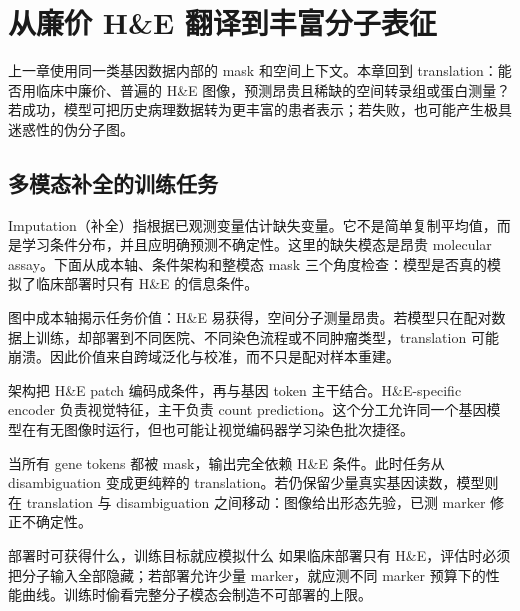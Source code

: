 \section{从廉价 H\&E 翻译到丰富分子表征}

上一章使用同一类基因数据内部的 mask 和空间上下文。本章回到 translation：能否用临床中廉价、普遍的 H\&E 图像，预测昂贵且稀缺的空间转录组或蛋白测量？若成功，模型可把历史病理数据转为更丰富的患者表示；若失败，也可能产生极具迷惑性的伪分子图。

\subsection{多模态补全的训练任务}

Imputation（补全）指根据已观测变量估计缺失变量。它不是简单复制平均值，而是学习条件分布，并且应明确预测不确定性。这里的缺失模态是昂贵 molecular assay。下面从成本轴、条件架构和整模态 mask 三个角度检查：模型是否真的模拟了临床部署时只有 H\&E 的信息条件。


图中成本轴揭示任务价值：H\&E 易获得，空间分子测量昂贵。若模型只在配对数据上训练，却部署到不同医院、不同染色流程或不同肿瘤类型，translation 可能崩溃。因此价值来自跨域泛化与校准，而不只是配对样本重建。


架构把 H\&E patch 编码成条件，再与基因 token 主干结合。H\&E-specific encoder 负责视觉特征，主干负责 count prediction。这个分工允许同一个基因模型在有无图像时运行，但也可能让视觉编码器学习染色批次捷径。


当所有 gene tokens 都被 mask，输出完全依赖 H\&E 条件。此时任务从 disambiguation 变成更纯粹的 translation。若仍保留少量真实基因读数，模型则在 translation 与 disambiguation 之间移动：图像给出形态先验，已测 marker 修正不确定性。

\begin{importantbox}{部署时可获得什么，训练目标就应模拟什么}
如果临床部署只有 H\&E，评估时必须把分子输入全部隐藏；若部署允许少量 marker，就应测不同 marker 预算下的性能曲线。训练时偷看完整分子模态会制造不可部署的上限。
\end{importantbox}

